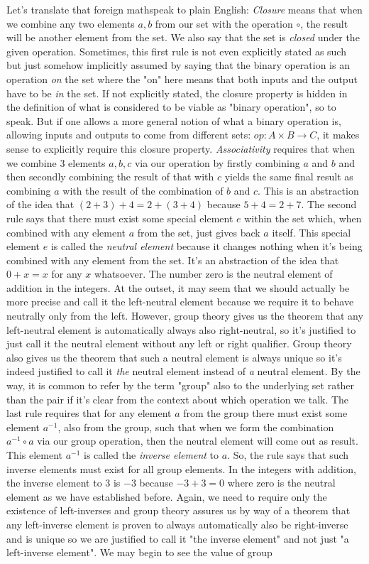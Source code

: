 Let's translate that foreign mathspeak to plain English: \emph{Closure} means that when we combine any two elements $a,b$ from our set with the operation $\circ$, the result will be another element from the set. We also say that the set is \emph{closed} under the given operation. Sometimes, this first rule is not even explicitly stated as such but just somehow implicitly assumed by saying that the binary operation is an operation \emph{on} the set where the "on" here means that both inputs and the output have to be \emph{in} the set. If not explicitly stated, the closure property is hidden in the definition of what is considered to be viable as "binary operation", so to speak. But if one allows a more general notion of what a binary operation is, allowing inputs and outputs to come from different sets: $op: A \times B \rightarrow C$, it makes sense to explicitly require this closure property. \emph{Associativity} requires that when we combine 3 elements $a,b,c$ via our operation by firstly combining $a$ and $b$ and then secondly combining the result of that with $c$ yields the same final result as combining $a$ with the result of the combination of $b$ and $c$. This is an abstraction of the idea that $(2+3)+4 = 2+(3+4)$ because $5+4 = 2+7$. The second rule says that there must exist some special element $e$ within the set which, when combined with any element $a$ from the set, just gives back $a$ itself. This special element $e$ is called the \emph{neutral element} because it changes nothing when it's being combined with any element from the set. It's an abstraction of the idea that $0+x = x$ for any $x$ whatsoever. The number zero is the neutral element of addition in the integers. At the outset, it may seem that we should actually be more precise and call it the left-neutral element because we require it to behave neutrally only from the left. However, group theory gives us the theorem that any left-neutral element is automatically always also right-neutral, so it's justified to just call it the neutral element without any left or right qualifier. Group theory also gives us the theorem that such a neutral element is always unique so it's indeed justified to call it \emph{the} neutral element instead of \emph{a} neutral element. By the way, it is common to refer by the term "group" also to the underlying set rather than the pair if it's clear from the context about which operation we talk. The last rule requires that for any element $a$ from the group there must exist some element $a^{-1}$, also from the group, such that when we form the combination $ a^{-1} \circ a$ via our group operation, then the neutral element will come out as result. This element $a^{-1}$ is called the \emph{inverse element} to $a$. So, the rule says that such inverse elements must exist for all group elements. In the integers with addition, the inverse element to $3$ is $-3$ because $-3 + 3 = 0$ where zero is the neutral element as we have established before. Again, we need to require only the existence of left-inverses and group theory assures us by way of a theorem that any left-inverse element is proven to always automatically also be right-inverse and is unique so we are justified to call it "the inverse element" and not just "a left-inverse element". We may begin to see the value of group 